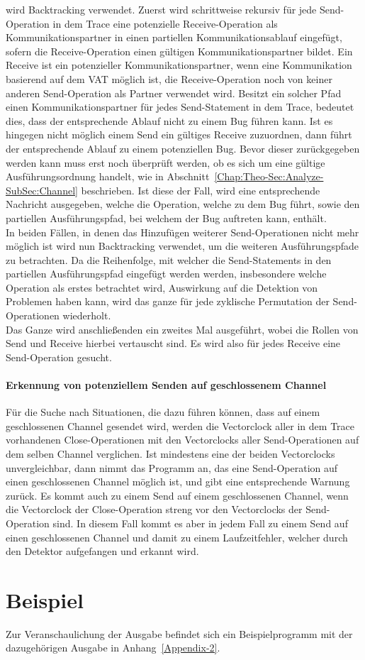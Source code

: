 wird Backtracking verwendet. Zuerst wird schrittweise rekursiv für jede Send-Operation 
in dem Trace eine potenzielle Receive-Operation als Kommunikationspartner 
in einen partiellen Kommunikationsablauf eingefügt, sofern die 
Receive-Operation einen gültigen Kommunikationspartner bildet. Ein Receive 
ist ein potenzieller Kommunikationspartner, wenn eine Kommunikation 
basierend auf dem VAT möglich ist, die Receive-Operation noch von keiner 
anderen Send-Operation als Partner verwendet wird. Besitzt ein solcher Pfad 
einen Kommunikationspartner für jedes Send-Statement in dem Trace, bedeutet dies, 
dass der entsprechende Ablauf nicht zu einem Bug führen kann. Ist es hingegen 
nicht möglich einem Send ein gültiges Receive zuzuordnen, dann führt der 
entsprechende Ablauf zu einem potenziellen Bug. Bevor dieser zurückgegeben 
werden kann muss erst noch überprüft werden, ob es sich um eine 
gültige Ausführungsordnung handelt, wie in Abschnitt~\ref{Chap:Theo-Sec:Analyze-SubSec:Channel} 
beschrieben. Ist diese der Fall, wird eine entsprechende Nachricht ausgegeben, 
welche die Operation, welche zu dem Bug führt, sowie den partiellen
Ausführungspfad, bei welchem der Bug auftreten kann, enthält.\\In beiden 
Fällen, in denen das Hinzufügen weiterer Send-Operationen nicht mehr möglich ist 
wird nun Backtracking verwendet, um die weiteren Ausführungspfade zu betrachten.
Da die Reihenfolge, mit welcher die Send-Statements in den partiellen 
Ausführungspfad eingefügt werden werden, insbesondere welche Operation als erstes 
betrachtet wird, Auswirkung auf die Detektion von Problemen haben kann, 
wird das ganze für jede zyklische Permutation der Send-Operationen wiederholt. \\
Das Ganze wird anschließenden ein zweites Mal ausgeführt, wobei die Rollen 
von Send und Receive hierbei vertauscht sind. Es wird also für jedes Receive 
eine Send-Operation gesucht. 

\paragraph{Erkennung von potenziellem Senden auf geschlossenem Channel}
Für die Suche nach Situationen, die dazu führen können, dass auf einem 
geschlossenen Channel gesendet wird, werden die Vectorclock aller in dem 
Trace vorhandenen Close-Operationen mit den Vectorclocks aller Send-Operationen
auf dem selben Channel verglichen. Ist mindestens eine der beiden Vectorclocks 
unvergleichbar, dann nimmt das Programm an, das eine Send-Operation auf 
einen geschlossenen Channel möglich ist, und gibt eine entsprechende 
Warnung zurück. Es kommt auch zu einem Send auf einem geschlossenen Channel, 
wenn die Vectorclock der Close-Operation streng vor den Vectorclocks 
der Send-Operation sind. In diesem Fall kommt es aber in jedem Fall zu einem 
Send auf einen geschlossenen Channel und damit zu einem Laufzeitfehler, 
welcher durch den Detektor aufgefangen und erkannt wird.


\section{Beispiel}
Zur Veranschaulichung der 
Ausgabe befindet sich ein Beispielprogramm mit der dazugehörigen Ausgabe 
in Anhang~\ref{Appendix-2}. 